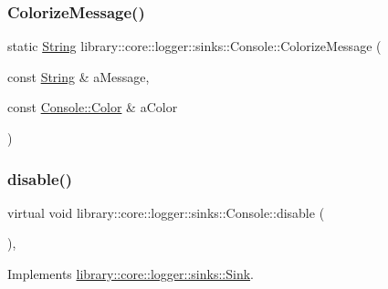\subsubsection{\texorpdfstring{ColorizeMessage()}{ColorizeMessage()}}
{\footnotesize\ttfamily static \mbox{\hyperlink{classlibrary_1_1core_1_1types_1_1_string}{String}} library\+::core\+::logger\+::sinks\+::\+Console\+::\+Colorize\+Message (\begin{DoxyParamCaption}\item[{const \mbox{\hyperlink{classlibrary_1_1core_1_1types_1_1_string}{String}} \&}]{a\+Message,  }\item[{const \mbox{\hyperlink{classlibrary_1_1core_1_1logger_1_1sinks_1_1_console_aa7a07d8165e1df74ad4d289d5220bc96}{Console\+::\+Color}} \&}]{a\+Color }\end{DoxyParamCaption})\hspace{0.3cm}{\ttfamily [static]}}

\mbox{\label{classlibrary_1_1core_1_1logger_1_1sinks_1_1_console_adc1a648433f26cc4397f1e703c9506c7}} 
\subsubsection{\texorpdfstring{disable()}{disable()}}
{\footnotesize\ttfamily virtual void library\+::core\+::logger\+::sinks\+::\+Console\+::disable (\begin{DoxyParamCaption}{ }\end{DoxyParamCaption})\hspace{0.3cm}{\ttfamily [override]}, {\ttfamily [virtual]}}



Implements \mbox{\hyperlink{classlibrary_1_1core_1_1logger_1_1sinks_1_1_sink_a3ab28f7a964d138fc9d080f026bb4143}{library\+::core\+::logger\+::sinks\+::\+Sink}}.

\mbox{\label{classlibrary_1_1core_1_1logger_1_1sinks_1_1_console_a09190fa0b66fa9a03792e6a546590da9}} 
